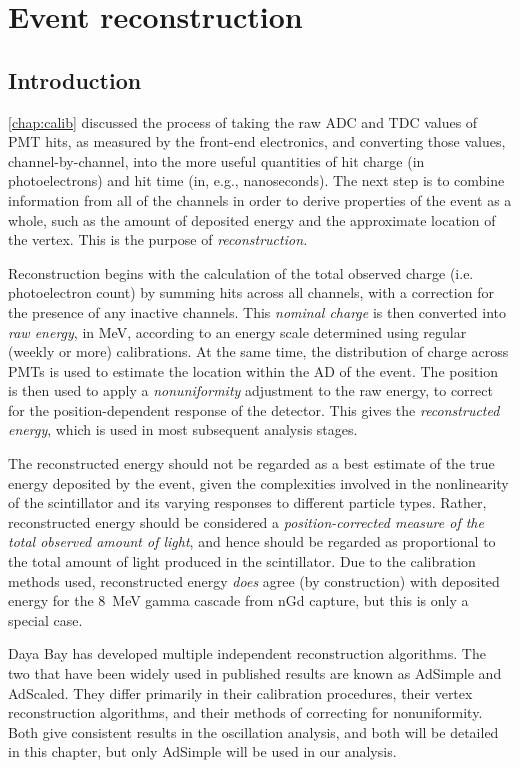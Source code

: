 \documentclass[../thesis.tex]{subfiles}
\begin{document}
\chapter{Event reconstruction}
\label{chap:recon}

\section{Introduction}
\label{sec:reconIntro}

\autoref{chap:calib} discussed the process of taking the raw ADC and TDC values of PMT hits, as measured by the front-end electronics, and converting those values, channel-by-channel, into the more useful quantities of hit charge (in photoelectrons) and hit time (in, e.g., nanoseconds). The next step is to combine information from all of the channels in order to derive properties of the event as a whole, such as the amount of deposited energy and the approximate location of the vertex. This is the purpose of \emph{reconstruction.}

Reconstruction begins with the calculation of the total observed charge (i.e. photoelectron count) by summing hits across all channels, with a correction for the presence of any inactive channels. This \emph{nominal charge} is then converted into \emph{raw energy}, in MeV, according to an energy scale determined using regular (weekly or more) calibrations. At the same time, the distribution of charge across PMTs is used to estimate the location within the AD of the event. The position is then used to apply a \emph{nonuniformity} adjustment to the raw energy, to correct for the position-dependent response of the detector. This gives the \emph{reconstructed energy}, which is used in most subsequent analysis stages.

The reconstructed energy should not be regarded as a best estimate of the true energy deposited by the event, given the complexities involved in the nonlinearity of the scintillator and its varying responses to different particle types. Rather, reconstructed energy should be considered a \emph{position-corrected measure of the total observed amount of light}, and hence should be regarded as proportional to the total amount of light produced in the scintillator. Due to the calibration methods used, reconstructed energy \emph{does} agree (by construction) with deposited energy for the 8~MeV gamma cascade from nGd capture, but this is only a special case.

Daya Bay has developed multiple independent reconstruction algorithms. The two that have been widely used in published results are known as AdSimple and AdScaled. They differ primarily in their calibration procedures, their vertex reconstruction algorithms, and their methods of correcting for nonuniformity. Both give consistent results in the oscillation analysis, and both will be detailed in this chapter, but only AdSimple will be used in our analysis.
\end{document}
